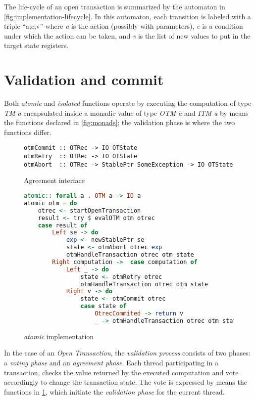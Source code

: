 The life-cycle of an open transaction is summarized by the automaton in \cref{fig:implementation-lifecycle}.
In this automaton, each transition is labeled with a triple ``a;c;v'' where \emph{a} is the action (possibly with parameters), \emph{c} is a condition under which the action can be taken, and \emph{v} is the list of new values to put in the target state registers.



\section{Validation and commit}

Both \emph{atomic} and \emph{isolated} functions operate by executing the computation of type \emph{TM a} encapsulated inside a monadic value of type \emph{OTM a} and \emph{ITM a} by means the functions declared in \cref{fig:monads}; the validation phase is where the two functions differ.

\begin{figure}
\begin{Verbatim}
otmCommit :: OTRec -> IO OTState
otmRetry  :: OTRec -> IO OTState
otmAbort  :: OTRec -> StablePtr SomeException -> IO OTState
\end{Verbatim}
\caption{Agreement interface}
\label{fig:agreement}
\end{figure}

\begin{figure}
\begin{lstlisting}[language=Haskell]
atomic:: forall a . OTM a -> IO a
atomic otm = do
    otrec <- startOpenTransaction
    result <- try $ evalOTM otm otrec
    case result of
        Left se -> do
            exp <- newStablePtr se
            state <- otmAbort otrec exp
            otmHandleTransaction otrec otm state
        Right computation ->  case computation of
            Left _ -> do
                state <- otmRetry otrec
                otmHandleTransaction otrec otm state
            Right v -> do
                state <- otmCommit otrec
                case state of
                    OtrecCommited -> return v
                    _ -> otmHandleTransaction otrec otm state
\end{lstlisting}
\caption{\emph{atomic} implementation}
\label{fig:atomic}
\end{figure}

In the case of an \emph{Open Transaction}, the \emph{validation process} consists of two phases: a \emph{voting phase} and an \emph{agreement phase}.
Each thread participating in a transaction, checks the value returned by the executed computation and vote accordingly to change the transaction state. The vote is expressed by means the functions in \cref{fig:agreement}, which initiate the \emph{validation phase} for the current thread.

